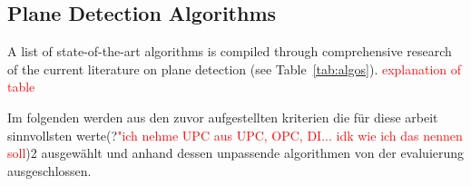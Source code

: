 \documentclass[main.tex]{subfiles}
\begin{document}


\subsection{Plane Detection Algorithms}


A list of state-of-the-art algorithms is compiled through comprehensive research of the current literature on plane detection (see Table~\ref{tab:algos}).
\textcolor{red}{explanation of table}

Im folgenden werden aus den zuvor aufgestellten kriterien die für diese arbeit sinnvollsten werte(?\textcolor{red}{"ich nehme UPC aus {UPC, OPC, DI}... idk wie ich das nennen soll})2 ausgewählt und anhand dessen unpassende algorithmen von der evaluierung ausgeschlossen.
\end{document}
